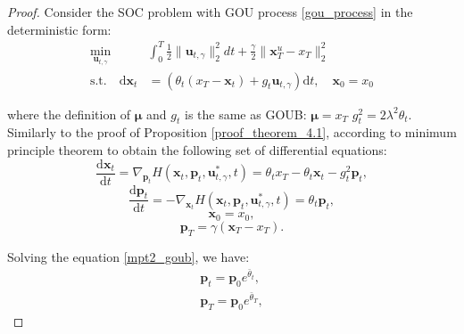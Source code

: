\begin{proof}
Consider the SOC problem with GOU process \eqref{gou_process} in the deterministic form: 
\begin{equation}
\begin{aligned}
\min_{\mathbf{u}_{t, \gamma}} &\int_{0}^{T} \frac{1}{2} \|\mathbf{u}_{t,\gamma}\|_2^2 dt + \frac{\gamma}{2} \| \mathbf{x}_T^u - x_T\|_2^2 \\
\text{s.t.} \quad \mathrm{d} \mathbf{x}_t &= \left( \theta_t(x_T - \mathbf{x}_t) + g_t \mathbf{u}_{t, \gamma} \right) \mathrm{d} t, \quad \mathbf{x}_0 = x_0
\end{aligned}
\end{equation}

where the definition of $\boldsymbol{\mu}$ and $g_t$ is the same as GOUB: $\boldsymbol{\mu} = x_T$  $g_{t}^{2} = 2 \lambda^2 \theta_t $. \\

Similarly to the proof of Proposition \ref{proof_theorem_4.1}, according to minimum principle theorem to obtain the following set of differential equations: 
\begin{equation}\label{mpt1_goub}
\frac{\mathrm{d}\mathbf{x}_{t}}{\mathrm{d}t}=\nabla_{\mathbf{p}_t}H\left(\mathbf{x}_{t},\mathbf{p}_{t},\mathbf{u}_{t, \gamma}^{*},t\right)= \theta_t x_T - \theta_t \mathbf{x}_t - g^2_t \mathbf{p}_{t} ,
\end{equation}
\begin{equation}\label{mpt2_goub}
\frac{\mathrm{d}\mathbf{p}_{t}}{\mathrm{d}t}=-\nabla_{\mathbf{x}_t}H\left(\mathbf{x}_{t},\mathbf{p}_{t},\mathbf{u}_{t, \gamma}^{*},t\right) = \theta_t \mathbf{p}_t,
\end{equation}
\begin{equation}\label{mpt3_goub}
\mathbf{x}_{0} = x_{0},
\end{equation}
\begin{equation}\label{mpt4_goub}
\mathbf{p}_{T}=\gamma \left(\mathbf{x}_T-x_{T}\right).
\end{equation}

Solving the equation \eqref{mpt2_goub}, we have:
\begin{equation}
\begin{gathered}
\mathbf{p}_{t} = \mathbf{p}_{0} e^{\bar{\theta}_{t}}, \\
\mathbf{p}_{T} = \mathbf{p}_{0} e^{\bar{\theta}_{T}},
\end{gathered}
\end{equation}


\end{proof}
